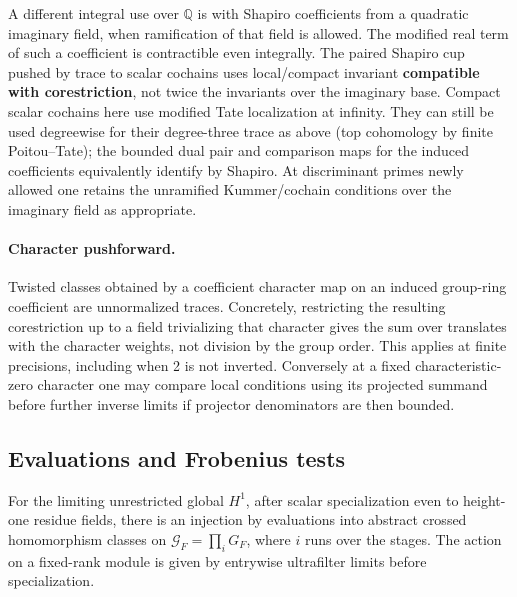 A different integral use over \(\mathbb Q\) is with Shapiro coefficients from a quadratic imaginary field, when ramification of that field is allowed. The modified real term of such a coefficient is contractible even integrally. The paired Shapiro cup pushed by trace to scalar cochains uses local/compact invariant \textbf{compatible with corestriction}, not twice the invariants over the imaginary base. Compact scalar cochains here use modified Tate localization at infinity. They can still be used degreewise for their degree-three trace as above (top cohomology by finite Poitou--Tate); the bounded dual pair and comparison maps for the induced coefficients equivalently identify by Shapiro. At discriminant primes newly allowed one retains the unramified Kummer/cochain conditions over the imaginary field as appropriate.

\paragraph{Character pushforward.}
Twisted classes obtained by a coefficient character map on an induced group-ring coefficient are unnormalized traces. Concretely, restricting the resulting corestriction up to a field trivializing that character gives the sum over translates with the character weights, not division by the group order. This applies at finite precisions, including when 2 is not inverted. Conversely at a fixed characteristic-zero character one may compare local conditions using its projected summand before further inverse limits if projector denominators are then bounded.

\subsection{Evaluations and Frobenius tests}

\begin{lemma}\label{lem:foundations-evaluation}
For the limiting unrestricted global \(H^1\), after scalar specialization even to height-one residue fields, there is an injection by evaluations into abstract crossed homomorphism classes on \(\mathcal G_F=\prod_i G_F\), where \(i\) runs over the stages. The action on a fixed-rank module is given by entrywise ultrafilter limits before specialization. \end{lemma}

